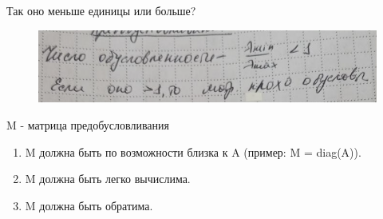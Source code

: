 \documentclass{bmstu}
\begin{document}
	Так оно меньше единицы или больше?
	\begin{figure}[h]
		\includegraphics[height=0.2\linewidth]{уааа.png}
	\end{figure}
	
	M - матрица предобусловливания
	
	\begin{enumerate}
		\item M должна быть по возможности близка к A (пример: M = diag(A)).
		\item M должна быть легко вычислима.
		\item M должна быть обратима.
	\end{enumerate}
\end{document}
